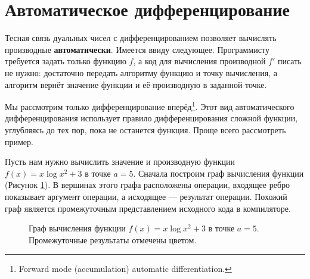 \documentclass{article}
\theoremstyle{definition}
\begin{document}
\section{Автоматическое дифференцирование}
Тесная связь дуальных чисел с дифференцированием позволяет вычислять производные \textbf{автоматически}. Имеется ввиду следующее. Программисту требуется задать только функцию $f$, а код для вычисления производной $f'$ писать не нужно: достаточно передать алгоритму функцию и точку вычисления, а алгоритм вернёт значение функции и её производную в заданной точке.

Мы рассмотрим только дифференцирование вперёд\footnote{Forward mode (accumulation) automatic differentiation.}. Этот вид автоматического дифференцирования использует правило дифференцирования сложной функции, углубляясь до тех пор, пока не останется  функция. Проще всего рассмотреть пример.

Пусть нам нужно вычислить значение и производную функции $f(x) = x \log{x^2} + 3$ в точке $a = 5$. Сначала построим граф вычисления функции (Рисунок \ref{fig:autodiff_func}). В вершинах этого графа расположены операции, входящее ребро показывает аргумент операции, а исходящее --- результат операции. Похожий граф является промежуточным представлением исходного кода в компиляторе.
\begin{figure}
\centering
{}
\caption{Граф вычисления функции $f(x) = x \log{x^2} + 3$ в точке $a = 5$. Промежуточные результаты отмечены цветом.}\label{fig:autodiff_func}
\end{figure}
\end{document}
